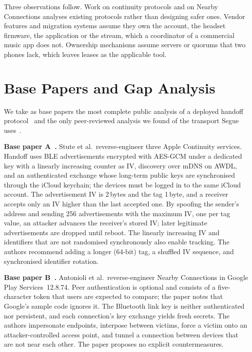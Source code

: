 \documentclass[conference]{IEEEtran}
\begin{document}
Three observations follow. Work on continuity protocols and on Nearby Connections analyses existing protocols rather than designing safer ones. Vendor features and migration systems assume they own the account, the headset firmware, the application or the stream, which a coordinator of a commercial music app does not. Ownership mechanisms assume servers or quorums that two phones lack, which leaves leases as the applicable tool.

\section{Base Papers and Gap Analysis}\label{sec:base}

We take as base papers the most complete public analysis of a deployed handoff protocol~\cite{stute2021} and the only peer-reviewed analysis we found of the transport Segue uses~\cite{antonioli2019}.

\textbf{Base paper A~\cite{stute2021}.} Stute et al.\ reverse-engineer three Apple Continuity services. Handoff uses BLE advertisements encrypted with AES-GCM under a dedicated key with a linearly increasing counter as IV, discovery over mDNS on AWDL, and an authenticated exchange whose long-term public keys are synchronised through the iCloud keychain; the devices must be logged in to the same iCloud account. The advertisement IV is 2\,bytes and the tag 1\,byte, and a receiver accepts only an IV higher than the last accepted one. By spoofing the sender's address and sending 256 advertisements with the maximum IV, one per tag value, an attacker advances the receiver's stored IV; later legitimate advertisements are dropped until reboot. The linearly increasing IV and identifiers that are not randomised synchronously also enable tracking. The authors recommend adding a longer (64-bit) tag, a shuffled IV sequence, and synchronised identifier rotation.

\textbf{Base paper B~\cite{antonioli2019}.} Antonioli et al.\ reverse-engineer Nearby Connections in Google Play Services~12.8.74. Peer authentication is optional and consists of a five-character token that users are expected to compare; the paper notes that Google's sample code ignores it. The Bluetooth link key is neither authenticated nor persistent, and each connection's key exchange yields fresh secrets. The authors impersonate endpoints, interpose between victims, force a victim onto an attacker-controlled access point, and tunnel a connection between devices that are not near each other. The paper proposes no explicit countermeasures.
\end{document}
